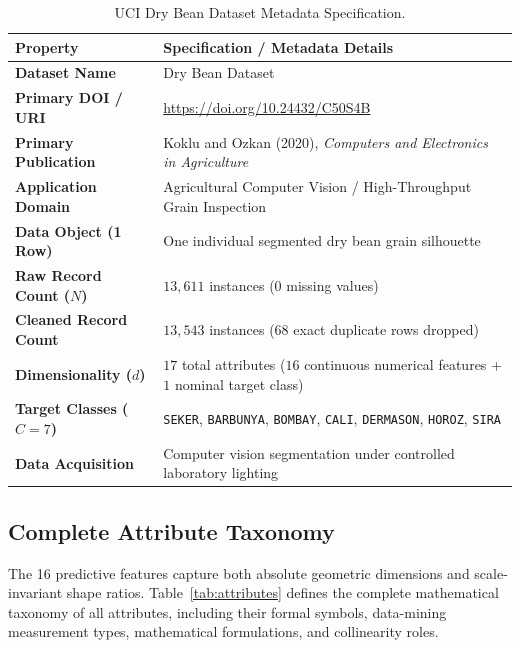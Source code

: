\documentclass[11pt,a4paper]{article}
\begin{document}
\begin{table}[htbp]
    \centering
    \small
    \caption{UCI Dry Bean Dataset Metadata Specification.}
    \label{tab:metadata}
    \setlength{\tabcolsep}{5pt}
    \begin{tabularx}{\linewidth}{@{} >{\bfseries}l X @{}}
        \toprule
        Property & Specification / Metadata Details \\
        \midrule
        Dataset Name & Dry Bean Dataset \\
        Primary DOI / URI & \url{https://doi.org/10.24432/C50S4B} \\
        Primary Publication & Koklu and Ozkan (2020), \textit{Computers and Electronics in Agriculture}~\citep{koklu2020multiclass} \\
        Application Domain & Agricultural Computer Vision / High-Throughput Grain Inspection \\
        Data Object (1 Row) & One individual segmented dry bean grain silhouette \\
        Raw Record Count ($N$) & $13{,}611$ instances ($0$ missing values) \\
        Cleaned Record Count & $13{,}543$ instances ($68$ exact duplicate rows dropped) \\
        Dimensionality ($d$) & $17$ total attributes ($16$ continuous numerical features + $1$ nominal target class) \\
        Target Classes ($C = 7$) & \texttt{SEKER}, \texttt{BARBUNYA}, \texttt{BOMBAY}, \texttt{CALI}, \texttt{DERMASON}, \texttt{HOROZ}, \texttt{SIRA} \\
        Data Acquisition & Computer vision segmentation under controlled laboratory lighting \\
        \bottomrule
    \end{tabularx}
\end{table}

\subsection{Complete Attribute Taxonomy}
\label{subsec:attribute_taxonomy}

The 16 predictive features capture both absolute geometric dimensions and scale-invariant shape ratios. Table~\ref{tab:attributes} defines the complete mathematical taxonomy of all attributes, including their formal symbols, data-mining measurement types, mathematical formulations, and collinearity roles.
\end{document}
